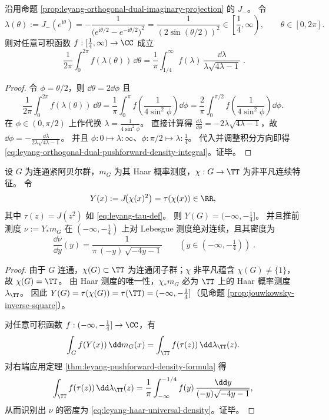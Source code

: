 \begin{theorem}\label{thm:leyang-orthogonal-dual-pushforward-density-formula}
沿用命题 \ref{prop:leyang-orthogonal-dual-imaginary-projection} 的 \(J_{-}\)。
令
\[
\lambda(\theta):=J_{-}(e^{\mathrm{i}\theta})
=-\frac{1}{\bigl(e^{\mathrm{i}\theta/2}-e^{-\mathrm{i}\theta/2}\bigr)^2}
=\frac{1}{(2\sin(\theta/2))^2}\in\left[\frac14,\infty\right),
\qquad \theta\in[0,2\pi].
\]
则对任意可积函数 \(f:[\tfrac14,\infty)\to\CC\) 成立
\begin{equation}\label{eq:leyang-orthogonal-dual-pushforward-density-integral}
\boxed{\;
\frac{1}{2\pi}\int_{0}^{2\pi} f(\lambda(\theta))\,\dd\theta
=
\frac{1}{\pi}\int_{1/4}^{\infty} f(\lambda)\,\frac{\dd\lambda}{\lambda\sqrt{4\lambda-1}}\; }.
\end{equation}
\end{theorem}
\begin{proof}
令 \(\phi=\theta/2\)，则 \(\dd\theta=2\dd\phi\) 且
\[
\frac{1}{2\pi}\int_{0}^{2\pi} f(\lambda(\theta))\,\dd\theta
=\frac{1}{\pi}\int_{0}^{\pi} f\!\left(\frac{1}{4\sin^2\phi}\right)\dd\phi
=\frac{2}{\pi}\int_{0}^{\pi/2} f\!\left(\frac{1}{4\sin^2\phi}\right)\dd\phi.
\]
在 \(\phi\in(0,\pi/2)\) 上作代换 \(\lambda=\frac{1}{4\sin^2\phi}\)。
直接计算得
\(
\frac{\dd\lambda}{\dd\phi}=-2\lambda\sqrt{4\lambda-1}
\)，故
\(
\dd\phi=-\frac{\dd\lambda}{2\lambda\sqrt{4\lambda-1}}
\)。
并且 \(\phi:0\mapsto \lambda:\infty\)、\(\phi:\pi/2\mapsto \lambda:\tfrac14\)。
代入并调整积分方向即得 \eqref{eq:leyang-orthogonal-dual-pushforward-density-integral}。证毕。
\end{proof}

\begin{theorem}\label{thm:leyang-inverse-square-haar-universality}
设 \(G\) 为连通紧阿贝尔群，\(m_G\) 为其 Haar 概率测度，\(\chi:G\to\TT\) 为非平凡连续特征。
令
\[
Y(x):=J\!\bigl(\chi(x)^2\bigr)=\tau(\chi(x))\in\RR,
\]
其中 \(\tau(z)=J(z^2)\) 如 \eqref{eq:leyang-tau-def}。
则 \(Y(G)=(-\infty,-\tfrac14]\)。
并且推前测度 \(\nu:=Y_{\ast}m_G\) 在 \((-\infty,-\tfrac14)\) 上对 Lebesgue 测度绝对连续，且其密度为
\begin{equation}\label{eq:leyang-haar-universal-density}
\boxed{\;
\frac{\dd\nu}{\dd y}(y)=\frac{1}{\pi\,(-y)\,\sqrt{-4y-1}}\qquad(y\in(-\infty,-\tfrac14))\; }.
\end{equation}
\end{theorem}
\begin{proof}
由于 \(G\) 连通，\(\chi(G)\subset\TT\) 为连通闭子群；\(\chi\) 非平凡蕴含 \(\chi(G)\neq\{1\}\)，故 \(\chi(G)=\TT\)。
由 Haar 测度的唯一性，\(\chi_{\ast}m_G\) 必为 \(\TT\) 上的 Haar 概率测度 \(\lambda_{\TT}\)。
因此 \(Y(G)=\tau(\chi(G))=\tau(\TT)=(-\infty,-\tfrac14]\)（见命题 \ref{prop:jouwkowsky-inverse-square}）。
\par
对任意可积函数 \(f:(-\infty,-\tfrac14]\to\CC\)，有
\[
\int_G f(Y(x))\,\dd m_G(x)
=\int_{\TT} f(\tau(z))\,\dd\lambda_{\TT}(z).
\]
对右端应用定理 \ref{thm:leyang-pushforward-density-formula} 得
\[
\int_{\TT} f(\tau(z))\,\dd\lambda_{\TT}(z)
=\frac{1}{\pi}\int_{-\infty}^{-1/4} f(y)\,\frac{\dd y}{(-y)\sqrt{-4y-1}},
\]
从而识别出 \(\nu\) 的密度为 \eqref{eq:leyang-haar-universal-density}。证毕。
\end{proof}


